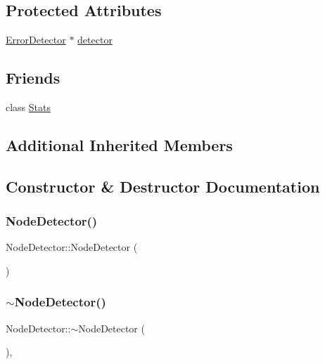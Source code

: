 \subsection*{Protected Attributes}
\begin{DoxyCompactItemize}
\item 
\hyperlink{class_error_detector}{Error\+Detector} $\ast$ \hyperlink{class_node_detector_a711fd643dc29b74e6dfe87e1aeb1b227}{detector}
\end{DoxyCompactItemize}
\subsection*{Friends}
\begin{DoxyCompactItemize}
\item 
class \hyperlink{class_node_detector_a129f65b6976377739eb6231b6962985e}{Stats}
\end{DoxyCompactItemize}
\subsection*{Additional Inherited Members}


\subsection{Constructor \& Destructor Documentation}
\mbox{\label{class_node_detector_a256160d034631f4fa14a83787f504aae}} 
\subsubsection{\texorpdfstring{Node\+Detector()}{NodeDetector()}}
{\footnotesize\ttfamily Node\+Detector\+::\+Node\+Detector (\begin{DoxyParamCaption}{ }\end{DoxyParamCaption})\hspace{0.3cm}{\ttfamily [protected]}}

\mbox{\label{class_node_detector_a3f8e6eedfce05ea8953ff1a41413ccfa}} 
\subsubsection{\texorpdfstring{$\sim$\+Node\+Detector()}{~NodeDetector()}}
{\footnotesize\ttfamily Node\+Detector\+::$\sim$\+Node\+Detector (\begin{DoxyParamCaption}{ }\end{DoxyParamCaption})\hspace{0.3cm}{\ttfamily [protected]}, {\ttfamily [virtual]}}



